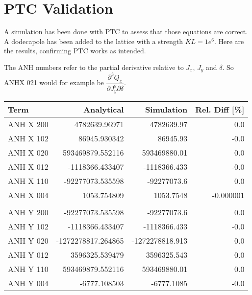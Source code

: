 \section{PTC Validation}\label{ptc-check}

A simulation has been done with PTC to assess that those equations are
correct. A dodecapole has been added to the lattice with a strength
\(KL = 1e^6\). Here are the results, confirming PTC works as intended.

The ANH numbers refer to the partial derivative relative to \(J_x\),
\(J_y\) and \(\delta\). So ANHX 021 would for example be
\(\dfrac{\partial^3 Q_x}{\partial J_y^2 \partial \delta}\).

\begin{center}
\begin{tabular}{lrrr}
\toprule
       Term &         Analytical &      Simulation & Rel. Diff [\%] \\
\midrule
  ANH X 200 &      4782639.96971 &      4782639.97 &           0.0 \\
  ANH X 102 &       86945.930342 &        86945.93 &          -0.0 \\
  ANH X 020 &   593469879.552116 &    593469880.01 &           0.0 \\
  ANH X 012 &    -1118366.433407 &    -1118366.433 &          -0.0 \\
  ANH X 110 &   -92277073.535598 &     -92277073.6 &           0.0 \\
  ANH X 004 &        1053.754809 &       1053.7548 &     -0.000001 \\
            &                    &                 &               \\
  ANH Y 200 &   -92277073.535598 &     -92277073.6 &           0.0 \\
  ANH Y 102 &    -1118366.433407 &    -1118366.433 &          -0.0 \\
  ANH Y 020 & -1272278817.264865 & -1272278818.913 &           0.0 \\
  ANH Y 012 &     3596325.539479 &     3596325.543 &           0.0 \\
  ANH Y 110 &   593469879.552116 &    593469880.01 &           0.0 \\
  ANH Y 004 &       -6777.108503 &      -6777.1085 &          -0.0 \\
\bottomrule
\end{tabular}
\end{center}



